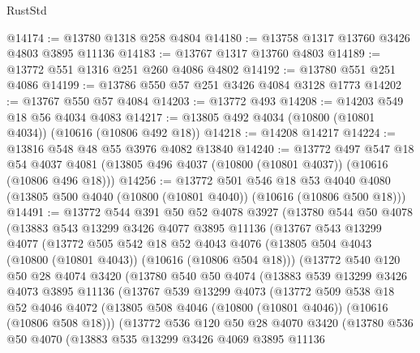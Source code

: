 \begin{lexlean}{RustStd}
\begin{coremodule}
@14174 := @13780 @1318 @258 @4804
@14180 := @13758 @1317 @13760 @3426 @4803 @3895 @11136
@14183 := @13767 @1317 @13760 @4803
@14189 := @13772 @551 @1316 @251 @260 @4086 @4802
@14192 := @13780 @551 @251 @4086
@14199 := @13786 @550 @57 @251 @3426 @4084 @3128 @1773
@14202 := @13767 @550 @57 @4084
@14203 := @13772 @493
@14208 := @14203 @549 @18 @56 @4034 @4083
@14217 := @13805 @492 @4034 (@10800 (@10801 @4034)) (@10616 (@10806 @492 @18))
@14218 := @14208 @14217
@14224 := @13816 @548 @48 @55 @3976 @4082 @13840
@14240 := @13772
    @497
    @547
    @18
    @54
    @4037
    @4081
    (@13805 @496 @4037 (@10800 (@10801 @4037)) (@10616 (@10806 @496 @18)))
@14256 := @13772
    @501
    @546
    @18
    @53
    @4040
    @4080
    (@13805 @500 @4040 (@10800 (@10801 @4040)) (@10616 (@10806 @500 @18)))
@14491 := @13772
    @544
    @391
    @50
    @52
    @4078
    @3927
    (@13780
      @544
      @50
      @4078
      (@13883
        @543
        @13299
        @3426
        @4077
        @3895
        @11136
        (@13767
          @543
          @13299
          @4077
          (@13772
            @505
            @542
            @18
            @52
            @4043
            @4076
            (@13805 @504 @4043 (@10800 (@10801 @4043)) (@10616 (@10806 @504 @18)))
            (@13772
              @540
              @120
              @50
              @28
              @4074
              @3420
              (@13780
                @540
                @50
                @4074
                (@13883
                  @539
                  @13299
                  @3426
                  @4073
                  @3895
                  @11136
                  (@13767
                    @539
                    @13299
                    @4073
                    (@13772
                      @509
                      @538
                      @18
                      @52
                      @4046
                      @4072
                      (@13805 @508 @4046 (@10800 (@10801 @4046)) (@10616 (@10806 @508 @18)))
                      (@13772
                        @536
                        @120
                        @50
                        @28
                        @4070
                        @3420
                        (@13780
                          @536
                          @50
                          @4070
                          (@13883
                            @535
                            @13299
                            @3426
                            @4069
                            @3895
                            @11136

\end{coremodule}
\end{lexlean}
